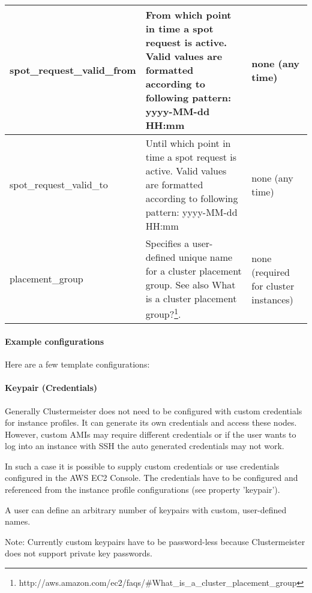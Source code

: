 \begin{longtable}{|l| p{6cm} | p{3cm}|}
spot\_request\_valid\_from & From which point in time a spot request is active. Valid values are formatted according to following pattern: yyyy-MM-dd HH:mm & none (any time)\\ \hline
spot\_request\_valid\_to & Until which point in time a spot request is active. Valid values are formatted according to following pattern: yyyy-MM-dd HH:mm & none (any time) \\ \hline
placement\_group & Specifies a user-defined unique name for a cluster placement group. See also What is a cluster placement group?\footnote{http://aws.amazon.com/ec2/faqs/\#What\_is\_a\_cluster\_placement\_group}. & none (required for cluster instances) \\ \hline
\end{longtable}

\paragraph{Example configurations}

Here are a few template configurations:



\paragraph{Keypair (Credentials)}

Generally Clustermeister does not need to be configured with custom credentials for instance profiles. It can generate its own credentials and access these nodes. However, custom AMIs may require different credentials or if the user wants to log into an instance with SSH the auto generated credentials may not work.

In such a case it is possible to supply custom credentials or use credentials configured in the AWS EC2 Console. The credentials have to be configured and referenced from the instance profile configurations (see property 'keypair').

A user can define an arbitrary number of keypairs with custom, user-defined names.

Note: Currently custom keypairs have to be password-less because Clustermeister does not support private key passwords.



